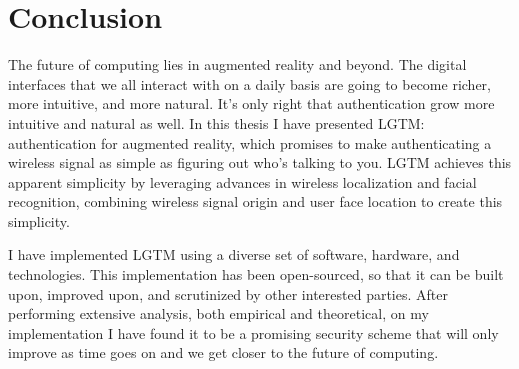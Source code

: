 \documentclass[12pt]{report}
\begin{document}
\section{Conclusion}
The future of computing lies in augmented reality and beyond. The digital interfaces that we all interact with on a daily basis are going to become richer, more intuitive, and more natural. It's only right that authentication grow more intuitive and natural as well. In this thesis I have presented LGTM: authentication for augmented reality, which promises to make authenticating a wireless signal as simple as figuring out who's talking to you. LGTM achieves this apparent simplicity by leveraging advances in wireless localization and facial recognition, combining wireless signal origin and user face location to create this simplicity. \par

I have implemented LGTM using a diverse set of software, hardware, and technologies. This implementation has been open-sourced, so that it can be built upon, improved upon, and scrutinized by other interested parties. After performing extensive analysis, both empirical and theoretical, on my implementation I have found it to be a promising security scheme that will only improve as time goes on and we get closer to the future of computing. \par


%
%

%






%


\end{document}
